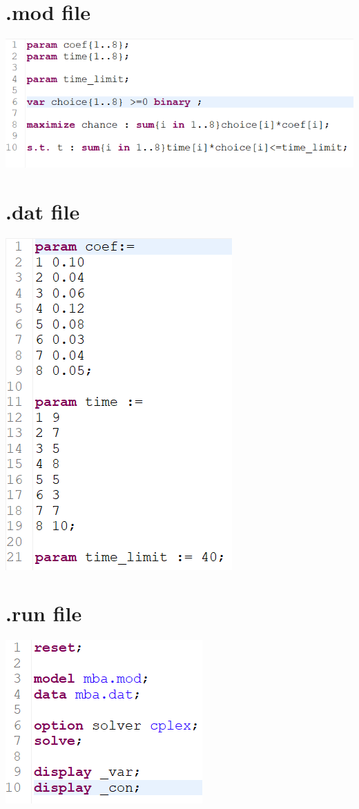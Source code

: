 \documentclass{article}
\begin{document}
\begin{appendices}
    \section{.mod file}
    \includegraphics[]{img/mba_mod.png}
    \section{.dat file}
    \includegraphics[]{img/mba_dat.png}
    \section{.run file}
    \includegraphics[]{img/mba_run.png}
\end{appendices}
\end{document}
